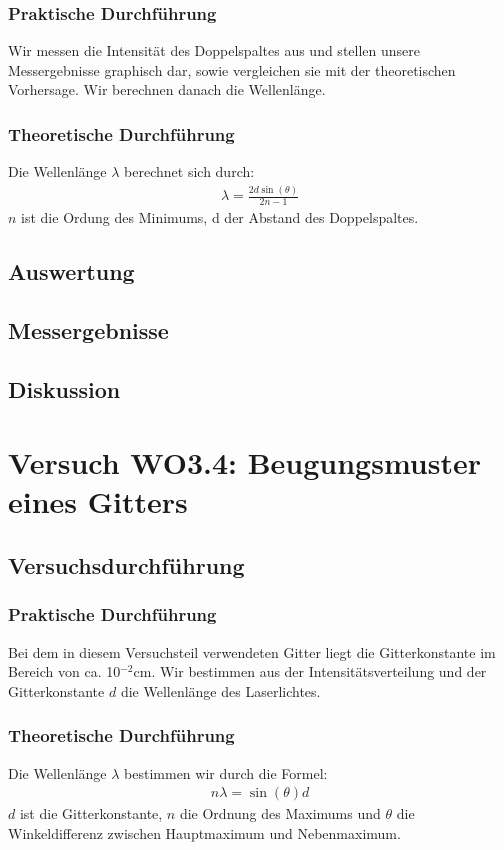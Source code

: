 \documentclass[12pt]{scrartcl}
\begin{document}
\subsubsection{Praktische Durchführung}
Wir messen die Intensität des Doppelspaltes aus und stellen unsere Messergebnisse graphisch dar, sowie vergleichen sie mit der theoretischen Vorhersage. Wir berechnen danach die Wellenlänge.
\subsubsection{Theoretische Durchführung}
Die Wellenlänge $\lambda$ berechnet sich durch:
\begin{align}
\lambda = \frac{2d \sin(\theta)}{2n-1}
\end{align}
$n$ ist die Ordung des Minimums, d der Abstand des Doppelspaltes.
\subsection{Auswertung}
\subsection{Messergebnisse}
\subsection{Diskussion}

\section{Versuch WO3.4: Beugungsmuster eines Gitters}
\subsection{Versuchsdurchführung}

\subsubsection{Praktische Durchführung}
Bei dem in diesem Versuchsteil verwendeten Gitter liegt die Gitterkonstante im Bereich von ca. 10$^{-2}$cm. Wir bestimmen aus der Intensitätsverteilung und der Gitterkonstante $d$ die Wellenlänge des Laserlichtes.
\subsubsection{Theoretische Durchführung}
Die Wellenlänge $\lambda$ bestimmen wir durch die Formel:
\begin{align}
n \lambda = \sin(\theta) d
\end{align}
$d$ ist die Gitterkonstante, $n$ die Ordnung des Maximums und $\theta$ die Winkeldifferenz zwischen Hauptmaximum und Nebenmaximum.
\end{document}
